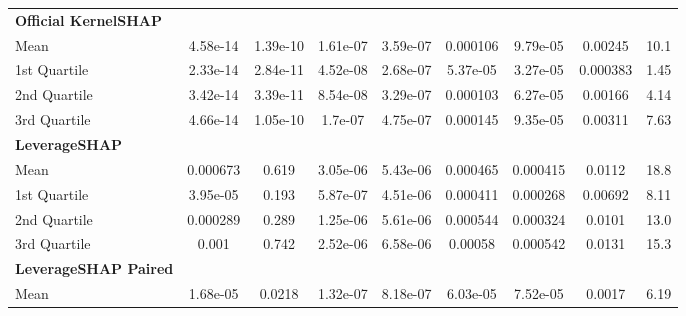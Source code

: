 {\begin{tabular} {lcccccccc}
\addlinespace[1ex] 
\textbf{Official KernelSHAP} &  &  &  &  &  &  &  &  \\ 
\hspace{7pt}Mean & \cellcolor{gold!60}4.58e-14 & \cellcolor{gold!60}1.39e-10 & \cellcolor{silver!60}1.61e-07 & \cellcolor{gold!60}3.59e-07 & \cellcolor{silver!60}0.000106 & \cellcolor{silver!60}9.79e-05 & \cellcolor{silver!60}0.00245 & \cellcolor{silver!60}10.1 \\ 
\hspace{7pt}1st Quartile & \cellcolor{gold!60}2.33e-14 & \cellcolor{gold!60}2.84e-11 & \cellcolor{silver!60}4.52e-08 & \cellcolor{gold!60}2.68e-07 & \cellcolor{silver!60}5.37e-05 & \cellcolor{bronze!60}3.27e-05 & \cellcolor{silver!60}0.000383 & \cellcolor{silver!60}1.45 \\ 
\hspace{7pt}2nd Quartile & \cellcolor{gold!60}3.42e-14 & \cellcolor{gold!60}3.39e-11 & \cellcolor{silver!60}8.54e-08 & \cellcolor{gold!60}3.29e-07 & \cellcolor{bronze!60}0.000103 & \cellcolor{silver!60}6.27e-05 & \cellcolor{bronze!60}0.00166 & \cellcolor{silver!60}4.14 \\ 
\hspace{7pt}3rd Quartile & \cellcolor{gold!60}4.66e-14 & \cellcolor{gold!60}1.05e-10 & \cellcolor{gold!60}1.7e-07 & \cellcolor{gold!60}4.75e-07 & \cellcolor{silver!60}0.000145 & \cellcolor{bronze!60}9.35e-05 & \cellcolor{silver!60}0.00311 & \cellcolor{silver!60}7.63 \\ 
\addlinespace[1ex] 
\textbf{LeverageSHAP} &  &  &  &  &  &  &  &  \\ 
\hspace{7pt}Mean & 0.000673 & 0.619 & 3.05e-06 & 5.43e-06 & 0.000465 & 0.000415 & 0.0112 & 18.8 \\ 
\hspace{7pt}1st Quartile & 3.95e-05 & 0.193 & 5.87e-07 & 4.51e-06 & 0.000411 & 0.000268 & 0.00692 & 8.11 \\ 
\hspace{7pt}2nd Quartile & 0.000289 & 0.289 & 1.25e-06 & 5.61e-06 & 0.000544 & 0.000324 & 0.0101 & 13.0 \\ 
\hspace{7pt}3rd Quartile & 0.001 & 0.742 & 2.52e-06 & 6.58e-06 & 0.00058 & 0.000542 & 0.0131 & 15.3 \\ 
\addlinespace[1ex] 
\textbf{LeverageSHAP Paired} &  &  &  &  &  &  &  &  \\ 
\hspace{7pt}Mean & \cellcolor{silver!60}1.68e-05 & \cellcolor{silver!60}0.0218 & \cellcolor{gold!60}1.32e-07 & \cellcolor{bronze!60}8.18e-07 & \cellcolor{gold!60}6.03e-05 & \cellcolor{gold!60}7.52e-05 & \cellcolor{gold!60}0.0017 & \cellcolor{gold!60}6.19 \\ 

\end{tabular}}
